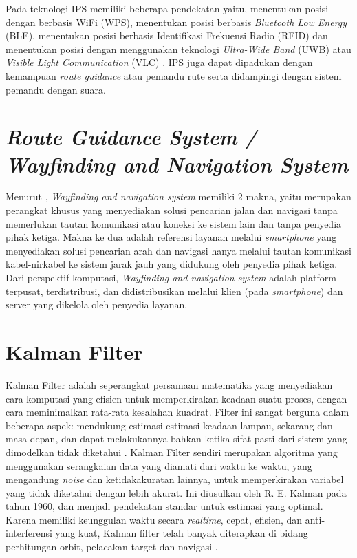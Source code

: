 \par Pada teknologi IPS memiliki beberapa pendekatan yaitu, menentukan posisi dengan berbasis WiFi (WPS), menentukan posisi berbasis \textit{Bluetooth Low Energy} (BLE), menentukan posisi berbasis Identifikasi Frekuensi Radio (RFID) dan menentukan posisi dengan menggunakan teknologi \textit{Ultra-Wide Band} (UWB) atau \textit{Visible Light Communication} (VLC) \citep{canton2017bluetooth}. IPS juga dapat dipadukan dengan kemampuan \textit{route guidance} atau pemandu rute serta didampingi dengan sistem pemandu dengan suara.


\section{\textit{Route Guidance System / Wayfinding and Navigation System}}
Menurut \citep{karimi2015indoor}, \textit{Wayfinding and navigation system} memiliki 2 makna, yaitu merupakan perangkat khusus yang menyediakan solusi pencarian jalan dan navigasi tanpa memerlukan tautan komunikasi atau koneksi ke sistem lain dan tanpa penyedia pihak ketiga. Makna ke dua adalah referensi layanan melalui \textit{smartphone} yang menyediakan solusi pencarian arah dan navigasi hanya melalui tautan komunikasi kabel-nirkabel ke sistem jarak jauh yang didukung oleh penyedia pihak ketiga. Dari perspektif komputasi, \textit{Wayfinding and navigation system} adalah platform terpusat, terdistribusi, dan didistribusikan melalui klien (pada \textit{smartphone}) dan server yang dikelola oleh penyedia layanan.

\section{Kalman Filter}
Kalman Filter adalah seperangkat persamaan matematika yang menyediakan cara komputasi yang efisien untuk memperkirakan keadaan suatu proses, dengan cara meminimalkan rata-rata kesalahan kuadrat. Filter ini sangat berguna dalam beberapa aspek: mendukung estimasi-estimasi keadaan lampau, sekarang dan masa depan, dan dapat melakukannya bahkan ketika sifat pasti dari sistem yang dimodelkan tidak diketahui \cite{welch2020kalman}. Kalman Filter sendiri merupakan algoritma yang menggunakan serangkaian data yang diamati dari waktu ke waktu, yang mengandung \textit{noise} dan ketidakakuratan lainnya, untuk memperkirakan variabel yang tidak diketahui dengan lebih akurat. Ini diusulkan oleh R. E. Kalman pada tahun 1960, dan menjadi pendekatan standar untuk estimasi yang optimal. Karena memiliki keunggulan waktu secara \textit{realtime}, cepat, efisien, dan anti-interferensi yang kuat, Kalman filter telah banyak diterapkan di bidang perhitungan orbit, pelacakan target dan navigasi \cite{li2015kalman}.

